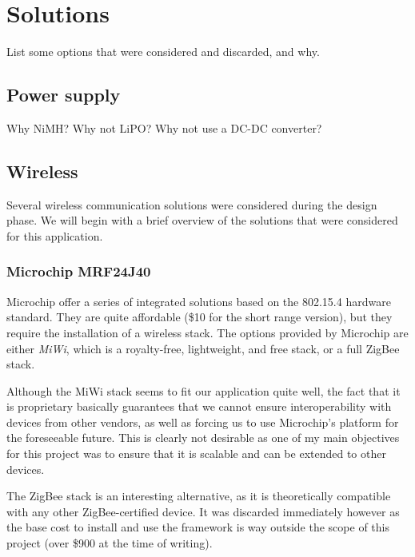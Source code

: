 \section{Solutions}
List some options that were considered and discarded, and why.

\subsection{Power supply}
Why NiMH? Why not LiPO? Why not use a DC-DC converter?


\subsection{Wireless}

Several wireless communication solutions were considered during the design
phase. We will begin with a brief overview of the solutions that were considered
for this application.

\subsubsection{Microchip MRF24J40}

Microchip offer a series of integrated solutions
based on the 802.15.4
hardware standard. They are quite affordable (\$10 for the short range version),
but they require the installation of a wireless stack. The options provided by
Microchip are either \emph{MiWi}, which is a royalty-free, lightweight, and free
stack, or a full ZigBee stack.

Although the MiWi stack seems to fit our application quite well, the fact that
it is proprietary basically guarantees that we cannot ensure interoperability
with devices from other vendors, as well as forcing us to use Microchip's
platform for the foreseeable future. This is clearly not desirable as one of my
main objectives for this project was to ensure that it is scalable and can be
extended to other devices.

The ZigBee stack is an interesting alternative, as it is theoretically
compatible with any other ZigBee-certified device. It was discarded immediately
however as the base cost to install and use the framework is way outside the
scope of this project (over \$900 at the time of writing).

